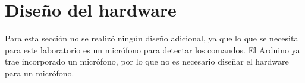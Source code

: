 \section{Diseño del hardware} 

Para esta sección no se realizó ningún diseño adicional, ya que lo que se necesita para este laboratorio es un micrófono para detectar los comandos. El Arduino ya trae incorporado un micrófono, por lo que no es necesario diseñar el hardware para un micrófono.